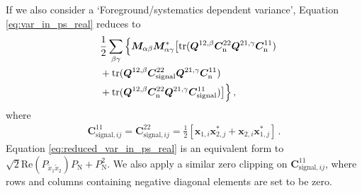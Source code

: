 \documentclass[12pt,a4paper]{article}
\begin{document}
If we also consider a `Foreground/systematics dependent variance', Equation \ref{eq:var_in_ps_real} reduces to 
\begin{align}
\label{eq:reduced_var_in_ps_real}
    & \frac{1}{2} \sum_{\beta\gamma} 
    \Big\{\bm{M}_{\alpha\beta} \bm{M}_{\alpha\gamma}^* \big[\text{tr}(\bm{Q}^{12,\beta} \bm{C}_\text{n}^{22} \bm{Q}^{21,\gamma} \bm{C}_\text{n}^{11}) 
    \notag \\
    \phantom{=} & + \text{tr}(\bm{Q}^{12,\beta} \bm{C}_\text{signal}^{22} \bm{Q}^{21,\gamma} \bm{C}_\text{n}^{11}) 
    \notag \\ 
    \phantom{=} & + \text{tr}(\bm{Q}^{12,\beta} \bm{C}_\text{n}^{22} \bm{Q}^{21,\gamma} \bm{C}_\text{signal}^{11}) \big]  \Big\}\,,
\end{align}
where
\begin{align}
    \bm{C}_{\text{signal}, ij}^{11} = \bm{C}_{\text{signal}, ij}^{22} = \frac{1}{2}\left[\bm{x}_{1,i} \bm{x}_{2,j}^* + \bm{x}_{2,i} \bm{x}_{1,j}^*\right]\,.
\end{align}
Equation \ref{eq:reduced_var_in_ps_real} is an equivalent form to $\sqrt{2}\text{Re} (P_{\tilde{x}_1\tilde{x}_2}) P_\text{N} + P_\text{N}^2$. We also apply a similar zero clipping on $\bm{C}_{\text{signal}, ij}^{11}$, where rows and columns containing negative diagonal elements are set to be zero.  
\end{document}
